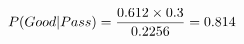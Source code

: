 \documentclass[preview]{standalone}
\begin{document}
\begin{align*}
\special{dvisvgm:raw <g id='unique000'>}P(Good|Pass)=\frac{0.612\times0.3}{0.2256}=0.814\special{dvisvgm:raw </g>}
\end{align*}
\end{document}
